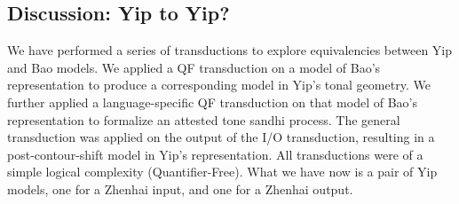 \documentclass{article}
\begin{document}
\subsection{Discussion: Yip to Yip?}
We have performed a series of transductions to explore equivalencies between Yip and Bao models. We applied a QF transduction on a model of Bao's representation to produce a corresponding model in Yip's tonal geometry. We further applied a language-specific QF transduction on that model of Bao's representation to formalize an attested tone sandhi process. The general transduction was applied on the output of the I/O transduction, resulting in a post-contour-shift model in Yip's representation. All transductions were of a simple logical complexity (Quantifier-Free). What we have now is a pair of Yip models, one for a Zhenhai input, and one for a Zhenhai output.
\end{document}
